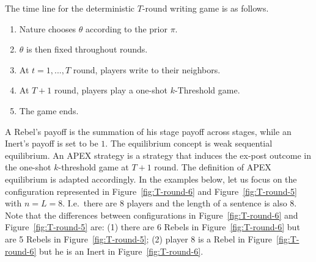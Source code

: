 \documentclass[12pt,letter]{article}
\theoremstyle{definition}
\theoremstyle{definition}
\theoremstyle{remark}
\theoremstyle{claim}
\begin{document}
The time line for the deterministic $T$-round writing game is as follows.
\begin{enumerate}
\item Nature chooses $\theta$ according to the prior $\pi$.
\item $\theta$ is then fixed throughout rounds.
\item At $t=1,...,T$ round, players write to their neighbors. 
\item At $T+1$ round, players play a one-shot $k$-Threshold game.
\item The game ends.
\end{enumerate}
A Rebel's payoff is the summation of his stage payoff across stages, while an Inert's payoff is set to be $1$. The equilibrium concept is weak sequential equilibrium. An APEX strategy is a strategy that induces the ex-post outcome in the one-shot $k$-threshold game at $T+1$ round. The definition of APEX equilibrium is adapted accordingly. In the examples below, let us focus on the configuration represented in Figure~\ref{fig:T-round-6} and Figure~\ref{fig:T-round-5} with $n=L=8$. I.e.~there are 8 players and the length of a sentence is also 8. Note that the differences between configurations in Figure~\ref{fig:T-round-6} and Figure~\ref{fig:T-round-5} are: (1) there are 6 Rebels in Figure~\ref{fig:T-round-6} but are 5 Rebels in Figure~\ref{fig:T-round-5}; (2) player 8 is a Rebel in Figure~\ref{fig:T-round-6} but he is an Inert in Figure~\ref{fig:T-round-6}.
\end{document}
